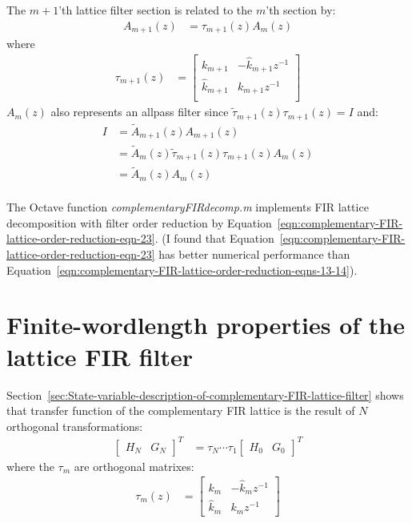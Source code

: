 \documentclass[a4paper,twoside,10pt,english]{report}
\begin{document}
The $m+1$'th lattice filter section is related to the $m$'th section by:
\begin{align*}
A_{m+1}\left(z\right) &= \tau_{m+1}\left(z\right)A_{m}\left(z\right)
\end{align*}
where
\begin{align*}
\tau_{m+1}\left(z\right) &=
\left[\begin{array}{cc}
k_{m+1} & -\hat{k}_{m+1}z^{-1} \\
\hat{k}_{m+1} & k_{m+1}z^{-1} \\
\end{array}\right] 
\end{align*}
$A_{m}\left(z\right)$ also represents an allpass filter since
$\tilde{\tau}_{m+1}\left(z\right)\tau_{m+1}\left(z\right)=I$ and:
\begin{align*}
  I &=  \tilde{A}_{m+1}\left(z\right)A_{m+1}\left(z\right)\\
    &=  \tilde{A}_{m}\left(z\right)\tilde{\tau}_{m+1}\left(z\right)
         \tau_{m+1}\left(z\right)A_{m}\left(z\right)\\
    &=  \tilde{A}_{m}\left(z\right)A_{m}\left(z\right)\\
\end{align*}

The Octave function \emph{complementaryFIRdecomp.m} implements FIR lattice
decomposition with filter order reduction by
Equation~\ref{eqn:complementary-FIR-lattice-order-reduction-eqn-23}.
(I found that
Equation~\ref{eqn:complementary-FIR-lattice-order-reduction-eqn-23}
has better numerical performance than
Equation~\ref{eqn:complementary-FIR-lattice-order-reduction-eqns-13-14}).
\section{Finite-wordlength properties of the lattice FIR filter}
Section~\ref{sec:State-variable-description-of-complementary-FIR-lattice-filter}
shows that transfer function of the complementary FIR lattice is
the result of $N$ orthogonal transformations:
\begin{align*}
  \left[\begin{array}{cc}
    H_{N}&  G_{N}\end{array}\right]^{T}&=\tau_{N}\cdots\tau_{1}
  \left[\begin{array}{cc}
          H_{0}& G_{0} \end{array}\right]^{T}
\end{align*}
      where the $\tau_{m}$ are orthogonal matrixes:
\begin{align*}
  \tau_{m}\left(z\right)
  &=  \left[\begin{array}{cc}
              k_{m} & -\hat{k}_{m}z^{-1} \\
              \hat{k}_{m} & k_{m}z^{-1}
            \end{array}\right]
\end{align*}
      
\end{document}

